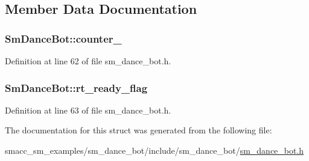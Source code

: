 \subsection{Member Data Documentation}
\subsubsection[{\texorpdfstring{counter\+\_\+1}{counter_1}}]{ Sm\+Dance\+Bot\+::counter\+\_}\hypertarget{structSmDanceBot_a9125df831508b9d16e747993c546f771}{}\label{structSmDanceBot_a9125df831508b9d16e747993c546f771}


Definition at line 62 of file sm\+\_\+dance\+\_\+bot.\+h.

\subsubsection[{\texorpdfstring{rt\+\_\+ready\+\_\+flag}{rt_ready_flag}}]{ Sm\+Dance\+Bot\+::rt\+\_\+ready\+\_\+flag}\hypertarget{structSmDanceBot_a4943f893a4f3184a78cf379b143cc7ed}{}\label{structSmDanceBot_a4943f893a4f3184a78cf379b143cc7ed}


Definition at line 63 of file sm\+\_\+dance\+\_\+bot.\+h.



The documentation for this struct was generated from the following file\+:\begin{DoxyCompactItemize}
\item 
smacc\+\_\+sm\+\_\+examples/sm\+\_\+dance\+\_\+bot/include/sm\+\_\+dance\+\_\+bot/\hyperlink{sm__dance__bot_8h}{sm\+\_\+dance\+\_\+bot.\+h}\end{DoxyCompactItemize}
